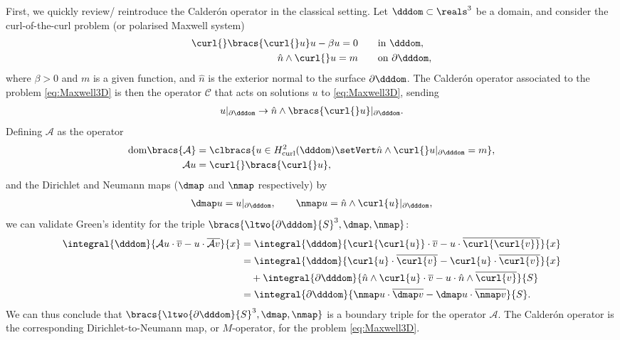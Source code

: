 First, we quickly review/ reintroduce the Calder\'on operator in the classical setting. 
Let $\dddom\subset\reals^3$ be a domain, and consider the curl-of-the-curl problem (or polarised Maxwell system)
\begin{subequations} \label{eq:Maxwell3D}
	\begin{align} 
		\curl{}\bracs{\curl{}u}u - \beta u = 0 &\qquad\text{in } \dddom, \\
		\hat{n}\wedge\curl{}u = m &\qquad\text{on } \partial\dddom,
	\end{align}
\end{subequations}
where $\beta>0$ and $m$ is a given function, and $\hat{n}$ is the exterior normal to the surface $\partial\dddom$.
The Calder\'on operator associated to the problem \eqref{eq:Maxwell3D} is then the operator $\mathcal{C}$ that acts on solutions $u$ to \eqref{eq:Maxwell3D}, sending
\begin{align*}
	u\vert_{\partial\dddom} \rightarrow \hat{n}\wedge\bracs{\curl{}u}\vert_{\partial\dddom}.
\end{align*}
Defining $\mathcal{A}$ as the operator
\begin{align*}
	\mathrm{dom}\bracs{\mathcal{A}} &= \clbracs{ u\in H^2_{\mathrm{curl}}(\dddom) \setVert \hat{n}\wedge\curl{}u\vert_{\partial\dddom} = m }, \\
	\mathcal{A}u &= \curl{}\bracs{\curl{}u},
\end{align*}
and the Dirichlet and Neumann maps ($\dmap$ and $\nmap$ respectively) by
\begin{align} \label{eq:ClassicalEM-DNMaps}
	\dmap u = u\vert_{\partial\dddom}, \qquad
	\nmap u = \hat{n}\wedge\curl{u}\vert_{\partial\dddom},
\end{align}
we can validate Green's identity for the triple $\bracs{\ltwo{\partial\dddom}{S}^3, \dmap, \nmap}$:
\begin{align*}
	\integral{\dddom}{ \mathcal{A}u \cdot \overline{v} - u \cdot \overline{\mathcal{A}v} }{x}
	&= \integral{\dddom}{ \curl{\curl{u}}\cdot\overline{v} - u\cdot\overline{\curl{\curl{v}}} }{x} \\
	&= \integral{\dddom}{ \curl{u}\cdot\overline{\curl{v}} - \curl{u}\cdot\overline{\curl{v}} }{x} \\
	&\quad + \integral{\partial\dddom}{ \hat{n}\wedge\curl{u}\cdot\overline{v} - u\cdot\hat{n}\wedge\overline{\curl{v}} }{S} \\
	&= \integral{\partial\dddom}{ \nmap u \cdot \overline{\dmap v} - \dmap u \cdot \overline{\nmap v} }{S}.
\end{align*}
We can thus conclude that $\bracs{\ltwo{\partial\dddom}{S}^3, \dmap, \nmap}$ is a boundary triple for the operator $\mathcal{A}$.
The Calder\'on operator is the corresponding Dirichlet-to-Neumann map, or $M$-operator,  for the problem \eqref{eq:Maxwell3D}.

